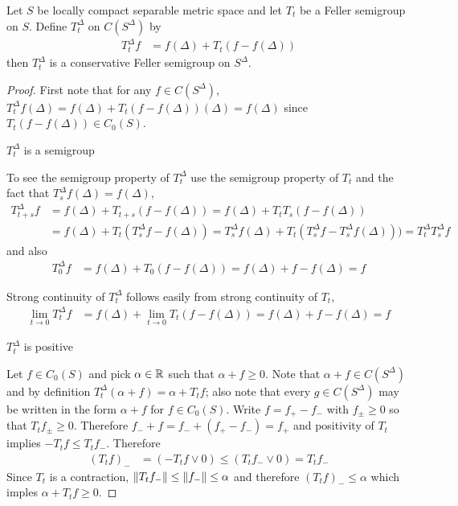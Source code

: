 \begin{prop}\label{FellerSemigroupCompactification}Let $S$ be locally compact separable metric space and let $T_t$ be a Feller semigroup on $S$.  Define $T^\Delta_t$ on $C(S^\Delta)$ by
\begin{align*}
T^\Delta_t f &= f(\Delta) + T_t (f - f(\Delta))
\end{align*}
then $T^\Delta_t$ is a conservative Feller semigroup on $S^\Delta$.
\end{prop}
\begin{proof}
First note that for any $f \in C(S^\Delta)$, $T^\Delta_t f (\Delta) = f(\Delta) + T_t (f - f(\Delta)) (\Delta) = f(\Delta)$ since $T_t (f - f(\Delta)) \in C_0(S)$.
\begin{clm} $T^\Delta_t$ is a semigroup
\end{clm}
To see the semigroup property of $T^\Delta_t$ use the semigroup property of $T_t$ and the fact that $T^\Delta_s f(\Delta) = f(\Delta)$,
\begin{align*}
T^\Delta_{t + s} f &= f(\Delta) + T_{t + s} (f - f(\Delta)) = f(\Delta) + T_{t} T_{s} (f - f(\Delta)) \\
&=f(\Delta) + T_t (T^\Delta_{s} f - f(\Delta)) = T^\Delta_s f(\Delta) + T_{t} (T^\Delta_{s} f - T^\Delta_s f(\Delta))) = T^\Delta_t T^\Delta_s f
\end{align*}
and also
\begin{align*}
T^\Delta_0 f &= f(\Delta) + T_0 (f - f(\Delta)) = f(\Delta) + f - f(\Delta) = f
\end{align*}

Strong continuity of $T^\Delta_t$ follows easily from strong continuity of $T_t$,
\begin{align*}
\lim_{t \to 0} T^\Delta_t f &= f(\Delta) + \lim_{t \to 0} T_t (f - f(\Delta)) = f(\Delta) + f - f(\Delta) =f
\end{align*}

\begin{clm}$T^\Delta_t$ is positive
\end{clm}
Let $f \in C_0(S)$ and pick $\alpha \in \mathbb{R}$ such that $\alpha + f \geq 0$.  Note that $\alpha + f \in C(S^\Delta)$ and by definition $T^\Delta_t (\alpha + f) = \alpha + T_t f$; also note that every $g \in C(S^\Delta)$ may be written in the form $\alpha + f$ for $f \in C_0(S)$.
Write $f = f_+ - f_-$ with $f_\pm \geq 0$ so that $T_t f_\pm \geq 0$.  Therefore $f_- + f = f_- + (f_+ - f_-) = f_+$ and positivity of $T_t$ implies $-T_t f \leq T_t f_-$.  Therefore
\begin{align*}
(T_t f)_- &= (-T_t f \vee 0) \leq (T_t f_- \vee 0) = T_t f_-
\end{align*}
Since $T_t$ is a contraction, $\lVert T_t f_- \rVert \leq \lVert f_- \rVert \leq \alpha$ and therefore $(T_tf)_- \leq \alpha$ which imples $\alpha + T_t f \geq 0$.


\end{proof}
